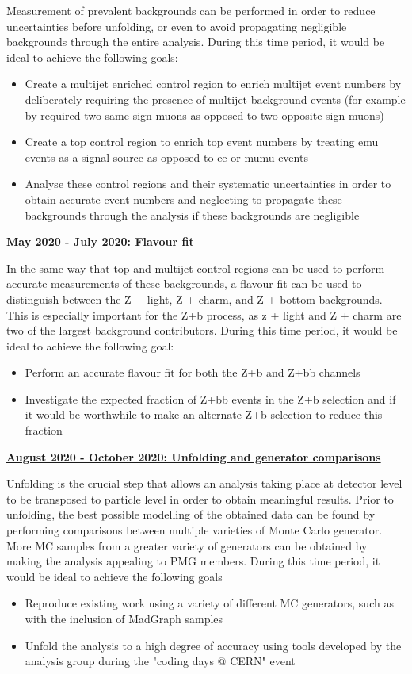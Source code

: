 \documentclass[12pt,a4paper,epsf,portrait,times,epsfig]{article}
\begin{document}
		\normalfont Measurement of prevalent backgrounds can be performed in order to reduce uncertainties before unfolding, or even to avoid propagating negligible backgrounds through the entire analysis. During this time period, it would be ideal to achieve the following goals: 
		\begin{itemize}
			\item Create a multijet enriched control region to enrich multijet event numbers by deliberately requiring the presence of multijet background events (for example by required two same sign muons as opposed to two opposite sign muons)
			\item Create a top control region to enrich top event numbers by treating emu events as a signal source as opposed to ee or mumu events 
			\item Analyse these control regions and their systematic uncertainties in order to obtain accurate event numbers and neglecting to propagate these backgrounds through the analysis if these backgrounds are negligible
		\end{itemize}		
				
		\bf \underline{May 2020 - July 2020: Flavour fit}
		
		\normalfont In the same way that top and multijet control regions can be used to perform accurate measurements of these backgrounds, a flavour fit can be used to distinguish between the Z + light, Z + charm, and Z + bottom backgrounds. This is especially important for the Z+b process, as z + light and Z + charm are two of the largest background contributors. During this time period, it would be ideal to achieve the following goal:
		
		\begin{itemize}
			\item Perform an accurate flavour fit for both the Z+b and Z+bb channels
			\item Investigate the expected fraction of Z+bb events in the Z+b selection and if it would be worthwhile to make an alternate Z+b selection to reduce this fraction
		\end{itemize}
	
		\newpage
		\bf \underline{August 2020 - October 2020: Unfolding and generator comparisons}
		
		\normalfont Unfolding is the crucial step that allows an analysis taking place at detector level to be transposed to particle level in order to obtain meaningful results. Prior to unfolding, the best possible modelling of the obtained data can be found by performing comparisons between multiple varieties of Monte Carlo generator. More MC samples from a greater variety of generators can be obtained by making the analysis appealing to PMG members. During this time period, it would be ideal to achieve the following goals
		
		\begin{itemize}
			\item Reproduce existing work using a variety of different MC generators, such as with the inclusion of MadGraph samples
			\item Unfold the analysis to a high degree of accuracy using tools developed by the analysis group during the "coding days @ CERN" event
		\end{itemize}		
				
\end{document}
